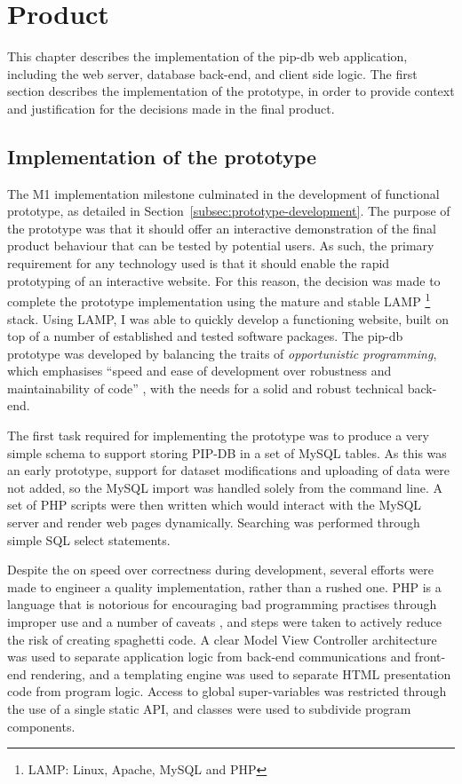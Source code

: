 \chapter{Product}\label{chap:product}

This chapter describes the implementation of the pip-db web
application, including the web server, database back-end, and client
side logic. The first section describes the implementation of the
prototype, in order to provide context and justification for the
decisions made in the final product.

\section{Implementation of the prototype}\label{sec:prototype-implementation}

The M1 implementation milestone culminated in the development of
functional prototype, as detailed in
Section~\ref{subsec:prototype-development}. The purpose of the
prototype was that it should offer an interactive demonstration of the
final product behaviour that can be tested by potential users. As
such, the primary requirement for any technology used is that it
should enable the rapid prototyping of an interactive website. For
this reason, the decision was made to complete the prototype
implementation using the mature and stable LAMP \footnote{LAMP: Linux,
  Apache, MySQL and PHP} stack. Using LAMP, I was able to quickly
develop a functioning website, built on top of a number of established
and tested software packages. The pip-db prototype was developed by
balancing the traits of \textit{opportunistic programming}, which
emphasises ``speed and ease of development over robustness and
maintainability of code'' \cite{brandt2008opportunistic}, with the
needs for a solid and robust technical back-end.

The first task required for implementing the prototype was to produce
a very simple schema to support storing PIP-DB in a set of MySQL
tables. As this was an early prototype, support for dataset
modifications and uploading of data were not added, so the MySQL
import was handled solely from the command line. A set of PHP scripts
were then written which would interact with the MySQL server and
render web pages dynamically. Searching was performed through simple
SQL select statements.

Despite the on speed over correctness during development, several
efforts were made to engineer a quality implementation, rather than a
rushed one. PHP is a language that is notorious for encouraging bad
programming practises through improper use and a number of caveats
\cite{munroe2012php}, and steps were taken to actively reduce the risk
of creating spaghetti code. A clear Model View Controller architecture
was used to separate application logic from back-end communications
and front-end rendering, and a templating engine was used to separate
HTML presentation code from program logic. Access to global
super-variables was restricted through the use of a single static API,
and classes were used to subdivide program components.

